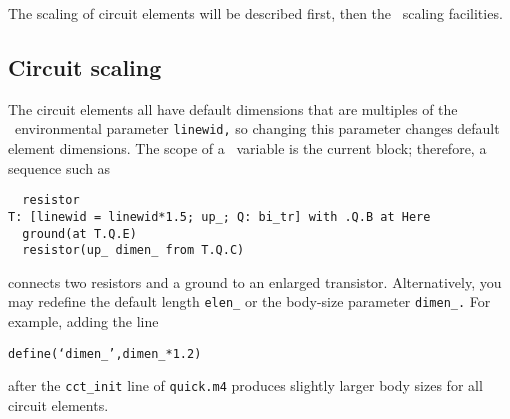 The scaling of circuit elements will be described first, then
the \pic\ scaling facilities.

\subsection{Circuit scaling}\label{Circuitscaling:}
The circuit elements all have default dimensions
that are multiples of the \pic\ environmental parameter {\tt linewid,}
so changing this parameter changes default element dimensions.
The scope of a \pic\ variable is the current block; therefore, a sequence
such as

\begin{verbatim}
  resistor
T: [linewid = linewid*1.5; up_; Q: bi_tr] with .Q.B at Here
  ground(at T.Q.E)
  resistor(up_ dimen_ from T.Q.C)
\end{verbatim}

\noindent%
connects two resistors and a ground to an enlarged transistor.
Alternatively, you may redefine the default length {\tt elen\_}
or the body-size parameter {\tt dimen\_.}  For example, adding the line

{\tt define(`dimen\_',dimen\_*1.2)}

\noindent%
after the {\tt cct\_init} line of {\tt quick.m4} produces slightly
larger body sizes for all circuit elements.

